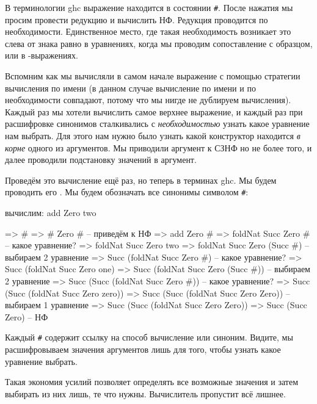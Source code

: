 В терминологии ghc выражение  находится 
в состоянии \verb!#!. После нажатия  мы просим провести
редукцию и вычислить НФ. Редукция проводится по необходимости.
Единственное место, где такая необходимость возникает это
слева от знака равно в уравнениях, когда мы проводим 
сопоставление с образцом, или в -выражениях.

Вспомним как мы вычисляли в самом начале выражение 
с помощью стратегии вычисления по имени (в данном случае вычисление
по имени и по необходимости совпадают, потому что мы нигде не 
дублируем вычисления). Каждый раз мы хотели вычислить самое
верхнее выражение, и каждый раз при расшифровке синонимов 
сталкивались с \emph{необходимостью} узнать какое уравнение 
нам выбрать. Для этого нам нужно было узнать какой конструктор 
находится \emph{в корне} одного из аргументов. Мы приводили
аргумент к СЗНФ но не более того, и далее проводили подстановку
значений в аргумент. 

Проведём это вычисление ещё раз, но теперь в терминах ghc. 
Мы будем проводить его . Мы будем обозначать все 
синонимы символом \verb!#!:

\begin{code}
вычислим:
        add   Zero two

=>      #                                   
=>      #   Zero #                                  -- приведём к НФ
=>      add Zero #
=>      foldNat Succ Zero #                         -- какое уравнение?
=>      foldNat Succ Zero two
=>      foldNat Succ Zero (Succ #)                  -- выбираем 2 уравнение
=>      Succ (foldNat Succ Zero #)                  -- какое уравнение?
=>      Succ (foldNat Succ Zero one)
=>      Succ (foldNat Succ Zero (Succ #))           -- выбираем 2 уравнение
=>      Succ (Succ (foldNat Succ Zero #))           -- какое уравнение?
=>      Succ (Succ (foldNat Succ Zero zero))
=>      Succ (Succ (foldNat Succ Zero Zero))        -- выбираем 1 уравнение
=>      Succ (Succ (foldNat Succ Zero Zero))
=>      Succ (Succ Zero)                            -- НФ
\end{code}


Каждый \verb!#! содержит ссылку на способ вычисление
или синоним. Видите, мы расшифровываем значения аргументов 
лишь для того, чтобы узнать какое уравнение выбрать.


Такая экономия усилий позволяет определять все возможные
значения и затем выбирать из них лишь, те что нужны.
Вычислитель пропустит всё лишнее. 


